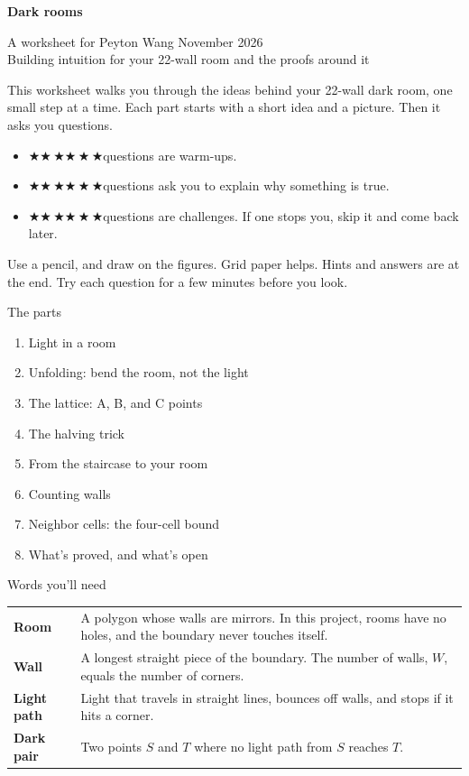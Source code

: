 \documentclass[11pt]{article}
\newcommand\st{\ensuremath{\scriptstyle\bigstar}}
\newcommand\lvl[1]{{\color{amber}\ifcase#1\or\st\or\st\,\st\or\st\,\st\,\st\fi}\enspace}
\begin{document}
\vspace*{0.5in}
{\sffamily\bfseries\fontsize{30}{34}\selectfont\color{wall}Dark rooms\par}
\vspace{6pt}
{\sffamily\large\color{muted}A worksheet for Peyton Wang \textperiodcentered{} November 2026\\
Building intuition for your 22-wall room and the proofs around it\par}
\vspace{0.3in}

This worksheet walks you through the ideas behind your 22-wall dark room, one small step at a time. Each part starts with a short idea and a picture. Then it asks you questions.
\begin{itemize}
\item \lvl{1}questions are warm-ups.
\item \lvl{2}questions ask you to explain why something is true.
\item \lvl{3}questions are challenges. If one stops you, skip it and come back later.
\end{itemize}
Use a pencil, and draw on the figures. Grid paper helps. Hints and answers are at the end. Try each question for a few minutes before you look.

\begin{infobox}{The parts}
\begin{enumerate}[label=\arabic*.]
\item Light in a room
\item Unfolding: bend the room, not the light
\item The lattice: A, B, and C points
\item The halving trick
\item From the staircase to your room
\item Counting walls
\item Neighbor cells: the four-cell bound
\item What's proved, and what's open
\end{enumerate}
\end{infobox}

\begin{infobox}{Words you'll need}
\renewcommand\arraystretch{1.25}
\begin{tabularx}{\linewidth}{@{}>{\bfseries}p{1in}X@{}}
Room & A polygon whose walls are mirrors. In this project, rooms have no holes, and the boundary never touches itself.\\
Wall & A longest straight piece of the boundary. The number of walls, $W$, equals the number of corners.\\
Light path & Light that travels in straight lines, bounces off walls, and stops if it hits a corner.\\
Dark pair & Two points $S$ and $T$ where no light path from $S$ reaches $T$.
\end{tabularx}
\end{infobox}
\end{document}
